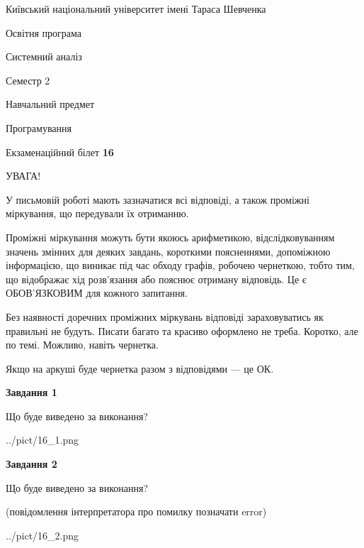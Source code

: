 \documentclass[12pt, ukrainian]{article}
\begin{document}
{{\begin {small}\par
{ \center  Київський національний університет імені Тараса Шевченка \par}
{\parbox {5 cm}{Освітня програма \hfill}{\parbox {7 cm}{Системний аналіз \hfill}}\parbox {6 cm}{\hfill Семестр 2}}\par
{\parbox {5 cm} {Навчальний предмет \hfill}\parbox {7 cm}{Програмування \hfill}\parbox {6cm}{\hfill}\par}\vspace{-7pt} \end{small}}{\center Екзаменаційний білет \No \textbf
{ 16 }\par}}
{
\begin {large}
УВАГА!

У письмовій роботі мають зазначатися всі відповіді, а також проміжні міркування, що передували їх отриманню.

Проміжні міркування можуть бути якоюсь арифметикою, відслідковуванням зна\-чень змінних для деяких завдань,
короткими поясненнями, допоміжною інформацією, що виникає під час обходу графів, робочею чернеткою,
тобто тим, що відображає хід розв’язання або пояснює отриману відповідь.
Це є ОБОВ’ЯЗКОВИМ для кожного запитання.

Без наявності доречних проміжних міркувань відповіді зараховуватись як правиль\-ні не будуть.
Писати багато та красиво оформлено не треба. Коротко, але по темі. Можли\-во, навіть чернетка.

Якщо на аркуші буде чернетка разом з відповідями --- це ОК.

\newpage

{\begin {center}\textbf{Завдання 1}\end {center}}\par
Що буде виведено за виконання?\par
\begin{center}
	{../pict/16_1.png}
\end{center}
\newpage

{\begin {center}\textbf{Завдання 2}\end {center}}\par
Що буде виведено за виконання?\par
 (повідомлення інтерпретатора про помилку позначати error)\par
\begin{center}
	{../pict/16_2.png}
\end{center}
\newpage


\end{large}}
\end{document}

